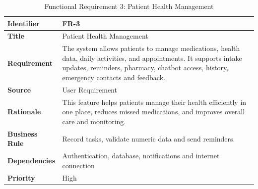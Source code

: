 \begin{table}[H]
\centering
\caption{Functional Requirement 3: Patient Health Management}
\begin{tabularx}{\textwidth}{|l|X|}
\hline
\textbf{Identifier} & FR-3 \\ \hline
\textbf{Title} & Patient Health Management \\ \hline
\textbf{Requirement} & The system allows patients to manage medications, health data, daily activities, and appointments. It supports intake updates, reminders, pharmacy, chatbot access, history, emergency contacts and feedback. \\ \hline
\textbf{Source} & User Requirement \\ \hline
\textbf{Rationale} & This feature helps patients manage their health efficiently in one place, reduces missed medications, and improves overall care and monitoring. \\ \hline
\textbf{Business Rule} & Record tasks, validate numeric data and send reminders. \\ \hline
\textbf{Dependencies} & Authentication, database, notifications and internet connection \\ \hline
\textbf{Priority} & High \\ \hline
\end{tabularx}
\end{table}

